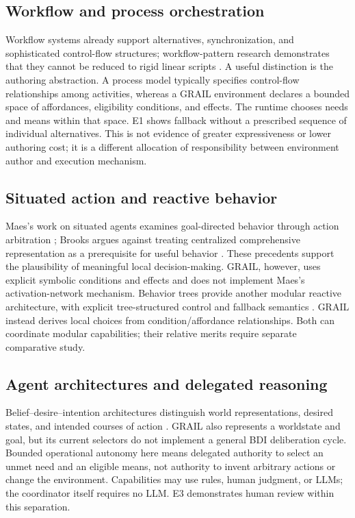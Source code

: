 \documentclass[11pt]{article}
\begin{document}
\subsection{Workflow and process orchestration}
Workflow systems already support alternatives, synchronization, and sophisticated control-flow structures; workflow-pattern research demonstrates that they cannot be reduced to rigid linear scripts \cite{Aalst2003}. A useful distinction is the authoring abstraction. A process model typically specifies control-flow relationships among activities, whereas a GRAIL environment declares a bounded space of affordances, eligibility conditions, and effects. The runtime chooses needs and means within that space. E1 shows fallback without a prescribed sequence of individual alternatives. This is not evidence of greater expressiveness or lower authoring cost; it is a different allocation of responsibility between environment author and execution mechanism.
\subsection{Situated action and reactive behavior}
Maes's work on situated agents examines goal-directed behavior through action arbitration \cite{Maes1990}; Brooks argues against treating centralized comprehensive representation as a prerequisite for useful behavior \cite{Brooks1991}. These precedents support the plausibility of meaningful local decision-making. GRAIL, however, uses explicit symbolic conditions and effects and does not implement Maes's activation-network mechanism. Behavior trees provide another modular reactive architecture, with explicit tree-structured control and fallback semantics \cite{Colledanchise2018}. GRAIL instead derives local choices from condition/affordance relationships. Both can coordinate modular capabilities; their relative merits require separate comparative study.
\subsection{Agent architectures and delegated reasoning}
Belief--desire--intention architectures distinguish world representations, desired states, and intended courses of action \cite{RaoGeorgeff1995}. GRAIL also represents a worldstate and goal, but its current selectors do not implement a general BDI deliberation cycle. Bounded operational autonomy here means delegated authority to select an unmet need and an eligible means, not authority to invent arbitrary actions or change the environment. Capabilities may use rules, human judgment, or LLMs; the coordinator itself requires no LLM. E3 demonstrates human review within this separation.
\end{document}
